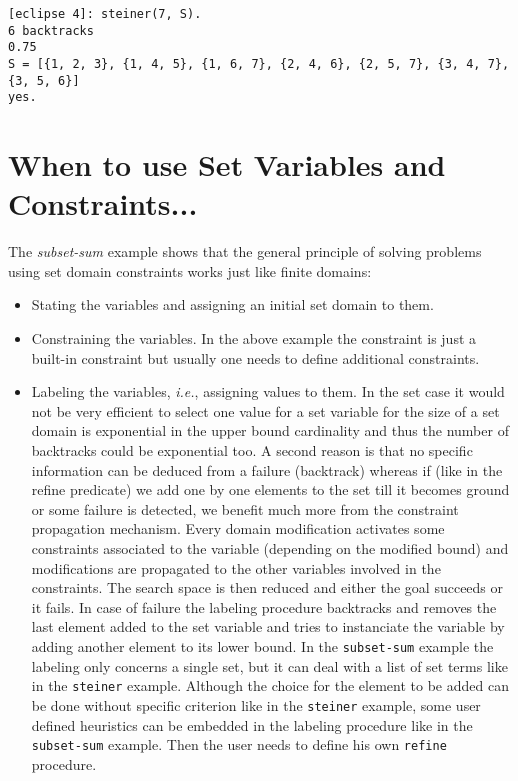 \begin{verbatim}
[eclipse 4]: steiner(7, S).
6 backtracks
0.75
S = [{1, 2, 3}, {1, 4, 5}, {1, 6, 7}, {2, 4, 6}, {2, 5, 7}, {3, 4, 7}, {3, 5, 6}]   
yes.
\end{verbatim}


\section{When to use Set Variables and Constraints...}
The {\em subset-sum} example shows that the general principle of solving
problems using set domain constraints works just like finite domains:
\begin{itemize}
\item Stating the variables and assigning an initial set domain to
them.
\item Constraining the variables. In the above example the constraint
is just a built-in constraint but usually one needs to define
additional constraints.
\item Labeling the variables, {\em i.e.}, assigning values to them.
In the set case it would not be very efficient to select one value for
a set variable for the size of a set domain is exponential in the
upper bound cardinality and thus the number of backtracks could be
exponential too. A second reason is that no specific information can
be deduced from a failure (backtrack) whereas if (like in the refine
predicate) we add one by one elements to the set till it becomes
ground or some failure is detected, we benefit much more from the
constraint propagation mechanism.  Every domain modification activates
some constraints associated to the variable (depending on the modified
bound) and modifications are propagated to the other variables
involved in the constraints. The search space is then reduced and
either the goal succeeds or it fails.  In case of failure the labeling
procedure backtracks and removes the last element added to the set
variable and tries to instanciate the variable by adding another
element to its lower bound.  In the \verb/subset-sum/ example the
labeling only concerns a single set, but it can deal with a list of
set terms like in the \verb/steiner/ example.  Although the choice for the
element to be added can be done without specific criterion like in the
\verb/steiner/ example, some  user defined heuristics can be embedded
in the labeling procedure like in the \verb/subset-sum/ example. Then
the user needs to define his own \verb/refine/ procedure.
\end{itemize}

